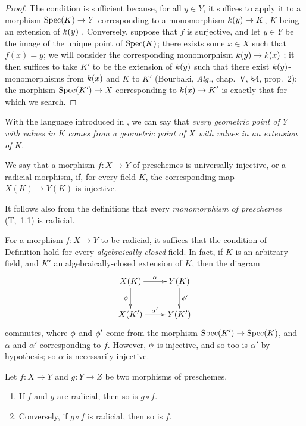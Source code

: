 \begin{proof}
\label{proof-prof-1.3.5.3}
The condition is sufficient because, for all $y\in Y$, it suffices to apply it to a morphism $\Spec(K)\to Y$ corresponding to a monomorphism $\kres(y)\to K$, $K$ being an extension of $k(y)$ .
Conversely, suppose that $f$ is surjective, and let $y\in Y$ be the image of the unique point of ${\mathop{\mathrm{Spec}}\nolimits}(K)$; there exists some $x\in X$ such that $f(x)=y$; we will consider the corresponding monomorphism $\kres(y)\to\kres(x)$ ; it then suffices to take $K'$ to be the extension of $k(y)$ such that there exist $k(y)$-monomorphisms from $k(x)$ and $K$ to $K'$ (Bourbaki, \emph{Alg.}, chap.~V, §4, prop.~2); the morphism $\Spec(K')\to X$ corresponding to $\kres(x)\to K'$ is exactly that for which we search.
\end{proof}

With the language introduced in , we can say that \emph{every geometric point of $Y$ with values in $K$ comes from a geometric point of $X$ with values in an extension of $K$}.

\begin{defn}[3.5.4]
\label{1.3.5.4}
We say that a morphism $f:X\to Y$ of preschemes is universally injective, or a radicial morphism, if, for every field $K$, the corresponding map $X(K)\to Y(K)$ is injective.
\end{defn}

It follows also from the definitions that every \emph{monomorphism of preschemes} (T,~1.1) is radicial.

\begin{env}[3.5.5]
\label{1.3.5.5}
For a morphism $f:X\to Y$ to be radicial, it suffices that the condition of Definition  hold for every \emph{algebraically closed} field.
In fact, if $K$ is an arbitrary field, and $K'$ an algebraically-closed extension of $K$, then the diagram
\[
  \xymatrix{
    X(K)\ar[r]^\alpha\ar[d]_\vphi &
    Y(K)\ar[d]^{\vphi'}\\
    X(K')\ar[r]^{\alpha'} &
    Y(K')
  }
\]
commutes, where $\phi$ and $\phi'$ come from the morphism $\Spec(K')\to\Spec(K)$, and $\alpha$ and $\alpha'$ corresponding to $f$.
However, $\phi$ is injective, and so too is $\alpha'$ by hypothesis; so $\alpha$ is necessarily injective.
\end{env}

\begin{prop}[3.5.6]
\label{1.3.5.6}
Let $f:X\to Y$ and $g:Y\to Z$ be two morphisms of preschemes.
\begin{enumerate}[label=\emph{(\roman*)}]
  \item If $f$ and $g$ are radicial, then so is $g\circ f$.
  \item Conversely, if $g\circ f$ is radicial, then so is $f$.
\end{enumerate}
\end{prop}

